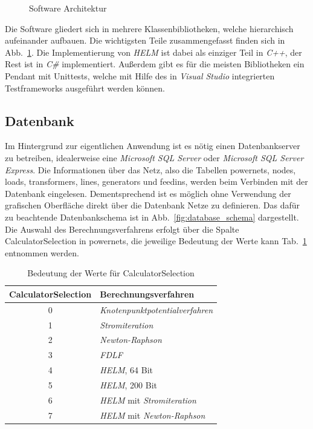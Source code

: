 \documentclass[12pt,a4paper]{article}
\newcommand{\reffig}[1]{{Abb.~\ref{#1}}}
\newcommand{\reftab}[1]{{Tab.~\ref{#1}}}
\begin{document}
	\begin{figure}
		\centering
		
		\caption{Software Architektur}
		\label{fig:software_architecture}
	\end{figure}
	
	Die Software gliedert sich in mehrere Klassenbibliotheken, welche hierarchisch aufeinander aufbauen. Die wichtigsten Teile zusammengefasst finden sich in \reffig{fig:software_architecture}. Die Implementierung von \emph{HELM} ist dabei als einziger Teil in \emph{C++}, der Rest ist in \emph{C\#} implementiert. Außerdem gibt es für die meisten Bibliotheken ein Pendant mit Unittests, welche mit Hilfe des in \emph{Visual Studio} integrierten Testframeworks ausgeführt werden können.
	
	\subsection{Datenbank}
	Im Hintergrund zur eigentlichen Anwendung ist es nötig einen Datenbankserver zu betreiben, idealerweise eine \emph{Microsoft SQL Server} oder \emph{Microsoft SQL Server Express}. Die Informationen über das Netz, also die Tabellen powernets, nodes, loads, transformers, lines, generators und feedins, werden beim Verbinden mit der Datenbank eingelesen. Dementsprechend ist es möglich ohne Verwendung der grafischen Oberfläche direkt über die Datenbank Netze zu definieren. Das dafür zu beachtende Datenbankschema ist in \reffig{fig:database_schema} dargestellt. Die Auswahl des Berechnungsverfahrens erfolgt über die Spalte CalculatorSelection in powernets, die jeweilige Bedeutung der Werte kann \reftab{tab:calculator_selection} entnommen werden.
	
	\begin{table}
		\centering
		\begin{tabular}{c|l}
			CalculatorSelection & Berechnungsverfahren \\ \hline
			0 & \emph{Knotenpunktpotentialverfahren} \\
	        1 & \emph{Stromiteration} \\
	        2 & \emph{Newton-Raphson} \\
	        3 & \emph{FDLF} \\
	        4 & \emph{HELM}, 64 Bit \\
	        5 & \emph{HELM}, 200 Bit \\
	        6 & \emph{HELM} mit \emph{Stromiteration} \\
	        7 & \emph{HELM} mit \emph{Newton-Raphson}
		\end{tabular}
		\caption{Bedeutung der Werte für CalculatorSelection}
		\label{tab:calculator_selection}
	\end{table}
	
\end{document}
